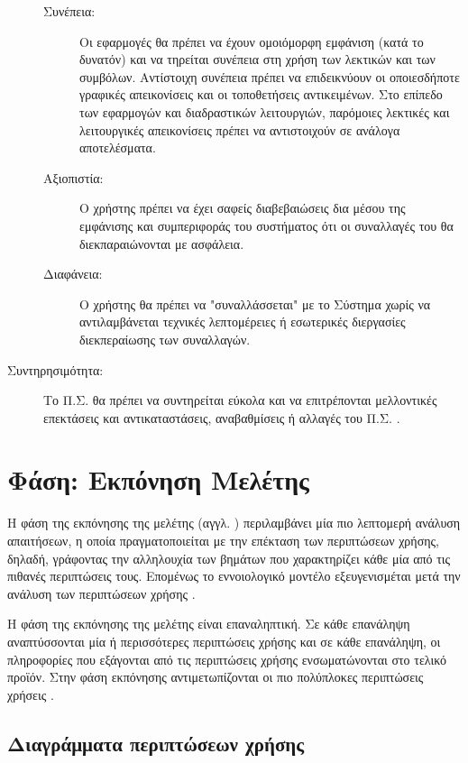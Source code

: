 \documentclass{assignment}
\begin{document}
\begin{description}
\begin{description}
	\item[Συνέπεια:] Οι εφαρμογές θα πρέπει να έχουν ομοιόμορφη εμφάνιση (κατά το δυνατόν) και να τηρείται συνέπεια στη χρήση των λεκτικών και των συμβόλων. Αντίστοιχη συνέπεια πρέπει να επιδεικνύουν οι οποιεσδήποτε γραφικές απεικονίσεις και οι τοποθετήσεις αντικειμένων. Στο επίπεδο των εφαρμογών και διαδραστικών λειτουργιών, παρόμοιες λεκτικές και λειτουργικές απεικονίσεις πρέπει να αντιστοιχούν σε ανάλογα αποτελέσματα.

	\item [Αξιοπιστία:] Ο χρήστης πρέπει να έχει σαφείς διαβεβαιώσεις δια μέσου της εμφάνισης και συμπεριφοράς του συστήματος ότι οι συναλλαγές του θα διεκπαραιώνονται με ασφάλεια.

	\item[Διαφάνεια:] Ο χρήστης θα πρέπει να "συναλλάσσεται" με το Σύστημα χωρίς να αντιλαμβάνεται τεχνικές λεπτομέρειες ή εσωτερικές διεργασίες διεκπεραίωσης των συναλλαγών.
\end{description}

\item[Συντηρησιμότητα:] Το Π.Σ. θα πρέπει να συντηρείται εύκολα και να επιτρέπονται μελλοντικές επεκτάσεις και αντικαταστάσεις, αναβαθμίσεις ή αλλαγές του Π.Σ. .

\end{description}


\section{Φάση: Εκπόνηση Μελέτης}
\label{section: Elaboration}

Η φάση της εκπόνησης της μελέτης (αγγλ. ) περιλαμβάνει μία πιο λεπτομερή ανάλυση απαιτήσεων, η οποία πραγματοποιείται με την επέκταση των περιπτώσεων χρήσης, δηλαδή, γράφοντας την αλληλουχία των βημάτων που χαρακτηρίζει κάθε μία από τις πιθανές περιπτώσεις τους. Επομένως το εννοιολογικό μοντέλο εξευγενισμέται μετά την ανάλυση των περιπτώσεων χρήσης \cite{wazlawick2014object}.  
	
Η φάση της εκπόνησης της μελέτης είναι επαναληπτική. Σε κάθε επανάληψη αναπτύσσονται μία ή περισσότερες περιπτώσεις χρήσης και σε κάθε επανάληψη, οι πληροφορίες που εξάγονται από τις περιπτώσεις χρήσης ενσωματώνονται στο τελικό προϊόν. Στην φάση εκπόνησης αντιμετωπίζονται οι πιο πολύπλοκες περιπτώσεις χρήσεις \cite{wazlawick2014object}.

\subsection{Διαγράμματα περιπτώσεων χρήσης}
\end{document}
